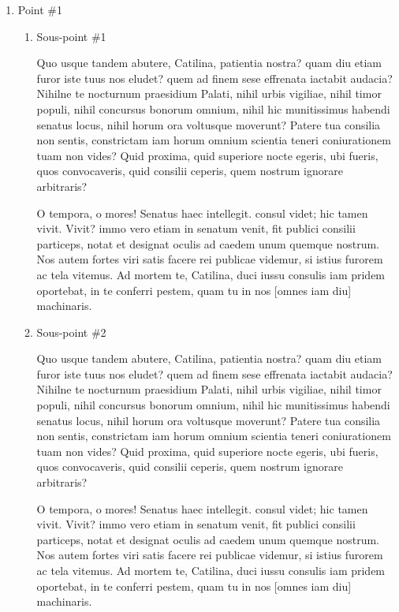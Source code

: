 \documentclass[12pt]{ULojpv}
\begin{document}
\begin{enumerate}
\begin{enumerate}

\item Point \#1

\begin{enumerate}

\item Sous-point \#1

Quo usque tandem abutere, Catilina, patientia nostra? quam diu etiam furor iste tuus nos eludet? quem ad finem sese effrenata iactabit audacia? Nihilne te nocturnum praesidium Palati, nihil urbis vigiliae, nihil timor populi, nihil concursus bonorum omnium, nihil hic munitissimus habendi senatus locus, nihil horum ora voltusque moverunt? Patere tua consilia non sentis, constrictam iam horum omnium scientia teneri coniurationem tuam non vides? Quid proxima, quid superiore nocte egeris, ubi fueris, quos convocaveris, quid consilii ceperis, quem nostrum ignorare arbitraris?

O tempora, o mores! Senatus haec intellegit. consul videt; hic tamen vivit. Vivit? immo vero etiam in senatum venit, fit publici consilii particeps, notat et designat oculis ad caedem unum quemque nostrum. Nos autem fortes viri satis facere rei publicae videmur, si istius furorem ac tela vitemus. Ad mortem te, Catilina, duci iussu consulis iam pridem oportebat, in te conferri pestem, quam tu in nos [omnes iam diu] machinaris.


\item Sous-point \#2

Quo usque tandem abutere, Catilina, patientia nostra? quam diu etiam furor iste tuus nos eludet? quem ad finem sese effrenata iactabit audacia? Nihilne te nocturnum praesidium Palati, nihil urbis vigiliae, nihil timor populi, nihil concursus bonorum omnium, nihil hic munitissimus habendi senatus locus, nihil horum ora voltusque moverunt? Patere tua consilia non sentis, constrictam iam horum omnium scientia teneri coniurationem tuam non vides? Quid proxima, quid superiore nocte egeris, ubi fueris, quos convocaveris, quid consilii ceperis, quem nostrum ignorare arbitraris?

O tempora, o mores! Senatus haec intellegit. consul videt; hic tamen vivit. Vivit? immo vero etiam in senatum venit, fit publici consilii particeps, notat et designat oculis ad caedem unum quemque nostrum. Nos autem fortes viri satis facere rei publicae videmur, si istius furorem ac tela vitemus. Ad mortem te, Catilina, duci iussu consulis iam pridem oportebat, in te conferri pestem, quam tu in nos [omnes iam diu] machinaris.


\end{enumerate}
\end{enumerate}
\end{enumerate}
\end{document}
